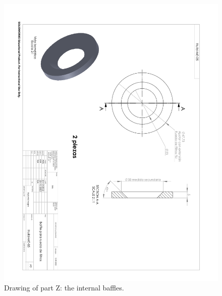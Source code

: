 \begin{figure}
\begin{center}
\includegraphics[angle=180,width=0.9\linewidth]{figures/huitzi-f20-part-Z.pdf}
\end{center}
\caption{Drawing of part Z: the internal baffles.}
\label{figure:huitzi-f20-part-Z}
\end{figure}

